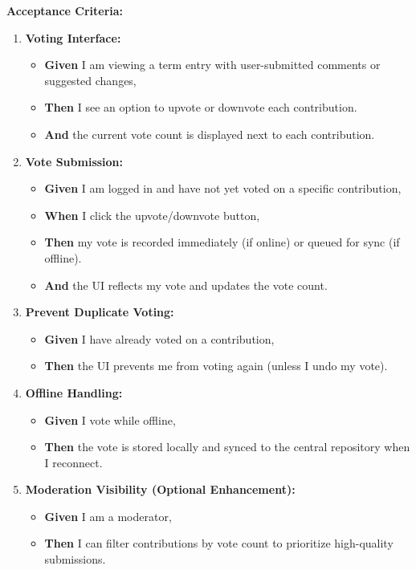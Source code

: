 \documentclass[12pt]{article}
\begin{document}
\vspace{1em}
\textbf{Acceptance Criteria:}
\begin{enumerate}
    \item \textbf{Voting Interface:}
    \begin{itemize}
        \item \textbf{Given} I am viewing a term entry with user-submitted comments or suggested changes,
        \item \textbf{Then} I see an option to upvote or downvote each contribution.
        \item \textbf{And} the current vote count is displayed next to each contribution.
    \end{itemize}

    \item \textbf{Vote Submission:}
    \begin{itemize}
        \item \textbf{Given} I am logged in and have not yet voted on a specific contribution,
        \item \textbf{When} I click the upvote/downvote button,
        \item \textbf{Then} my vote is recorded immediately (if online) or queued for sync (if offline).
        \item \textbf{And} the UI reflects my vote and updates the vote count.
    \end{itemize}

    \item \textbf{Prevent Duplicate Voting:}
    \begin{itemize}
        \item \textbf{Given} I have already voted on a contribution,
        \item \textbf{Then} the UI prevents me from voting again (unless I undo my vote).
    \end{itemize}

    \item \textbf{Offline Handling:}
    \begin{itemize}
        \item \textbf{Given} I vote while offline,
        \item \textbf{Then} the vote is stored locally and synced to the central repository when I reconnect.
    \end{itemize}

    \item \textbf{Moderation Visibility (Optional Enhancement):}
    \begin{itemize}
        \item \textbf{Given} I am a moderator,
        \item \textbf{Then} I can filter contributions by vote count to prioritize high-quality submissions.
    \end{itemize}


\end{enumerate}
\end{document}
